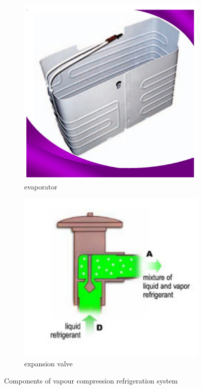 \documentclass{article}
\begin{document}
\begin{figure}
  \vspace{1cm}
  
  \begin{subfigure}{0.45\textwidth}
      \includegraphics[width=\textwidth]{img/evaporator.png}
      \caption{evaporator}
      \label{subfig:evaporator}
  \end{subfigure}
  \hfill
  \begin{subfigure}{0.45\textwidth}
      \includegraphics[width=\textwidth]{img/expansion.png}
      \caption{expansion valve}
      \label{subfig:expansion valve}
  \end{subfigure}
  
  \caption{Components of vapour compression refrigeration system}
  \label{fig:four_images}
\end{figure}
\end{document}
